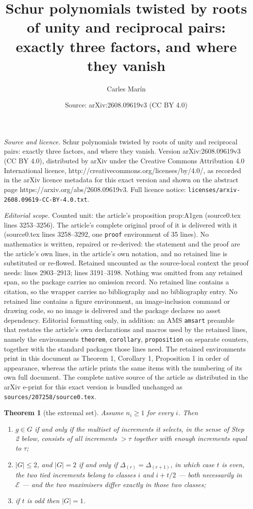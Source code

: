 \documentclass[10pt,a4paper]{amsart}
\title{Schur polynomials twisted by roots of unity and reciprocal pairs: exactly three factors, and where they vanish}
\author{Carles Mar\'in}
\date{Source: arXiv:2608.09619v3 (CC BY 4.0)}
\newtheorem{theorem}{Theorem}
\begin{document}
\maketitle

\noindent\emph{Source and licence.} Schur polynomials twisted by roots of unity and reciprocal pairs: exactly three factors, and where they vanish. Version arXiv:2608.09619v3 (CC BY 4.0), distributed by arXiv under the Creative Commons Attribution 4.0 International licence, http://creativecommons.org/licenses/by/4.0/, as recorded in the arXiv licence metadata for this exact version and shown on the abstract page https://arxiv.org/abs/2608.09619v3. Full licence notice: \texttt{licenses/arxiv-2608.09619-CC-BY-4.0.txt}.\par\smallskip

\noindent\textit{Editorial scope.} Counted unit: the article's proposition prop:A1gen (source0.tex lines 3253--3256). The article's complete original proof of it is delivered with it (source0.tex lines 3258--3292, one \texttt{proof} environment of 35 lines). No mathematics is written, repaired or re-derived: the statement and the proof are the article's own lines, in the article's own notation, and no retained line is substituted or re-flowed.  Retained uncounted as the source-local context the proof needs: lines 2903--2913; lines 3191--3198.  Nothing was omitted from any retained span, so the package carries no omission record.  No retained line contains a citation, so the wrapper carries no bibliography and no bibliography entry.  No retained line contains a figure environment, an image-inclusion command or drawing code, so no image is delivered and the package declares no asset dependency.  Editorial formatting only, in addition: an AMS \texttt{amsart} preamble that restates the article's own declarations and macros used by the retained lines, namely the environments \texttt{theorem}, \texttt{corollary}, \texttt{proposition} on separate counters, together with the standard packages those lines need.  The retained environments print in this document as Theorem 1, Corollary 1, Proposition 1 in order of appearance, whereas the article prints the same items with the numbering of its own full document.  The complete native source of the article as distributed in the arXiv e-print for this exact version is bundled unchanged as \texttt{sources/207258/source0.tex}.
\begin{theorem}[the extremal set]\label{thm:Ggen}
Assume $n_i\ge1$ for every $i$. Then
\begin{enumerate}
\item[\rm(a)] $g\in G$ if and only if the multiset of increments it selects, in the sense of Step 2
below, consists of all increments $>\tau$ together with enough increments equal to $\tau$;
\item[\rm(b)] $|G|\le2$, and $|G|=2$ if and only if $\Delta_{(r)}=\Delta_{(r+1)}$, in which case $t$
is even, the two tied increments belong to classes $i$ and $i+t/2$ --- both necessarily in
$\mathcal{E}$ --- and the two maximisers differ exactly in those two classes;
\item[\rm(c)] if $t$ is odd then $|G|=1$.
\end{enumerate}
\end{theorem}
\end{document}
